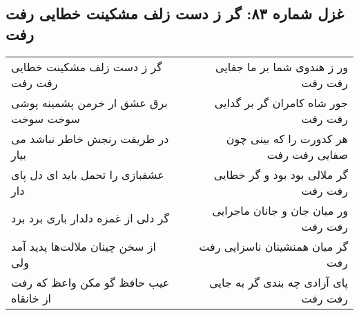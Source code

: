 \begin{center}
\section*{غزل شماره ۸۳: گر ز دست زلف مشکینت خطایی رفت رفت}
\label{sec:sh083}
\begin{longtable}{l p{0.5cm} r}
گر ز دست زلف مشکینت خطایی رفت رفت
&&
ور ز هندوی شما بر ما جفایی رفت رفت
\\
برق عشق ار خرمن پشمینه پوشی سوخت سوخت
&&
جور شاه کامران گر بر گدایی رفت رفت
\\
در طریقت رنجش خاطر نباشد می بیار
&&
هر کدورت را که بینی چون صفایی رفت رفت
\\
عشقبازی را تحمل باید ای دل پای دار
&&
گر ملالی بود بود و گر خطایی رفت رفت
\\
گر دلی از غمزه دلدار باری برد برد
&&
ور میان جان و جانان ماجرایی رفت رفت
\\
از سخن چینان ملالت‌ها پدید آمد ولی
&&
گر میان همنشینان ناسزایی رفت رفت
\\
عیب حافظ گو مکن واعظ که رفت از خانقاه
&&
پای آزادی چه بندی گر به جایی رفت رفت
\\
\end{longtable}
\end{center}
